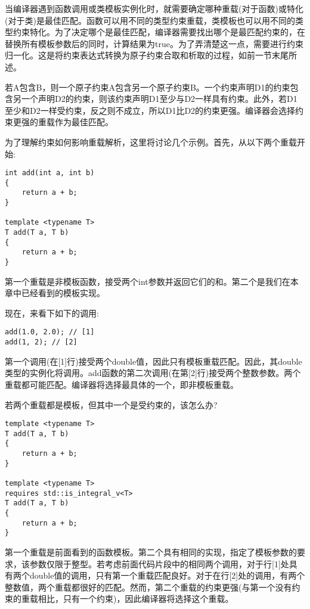 当编译器遇到函数调用或类模板实例化时，就需要确定哪种重载(对于函数)或特化(对于类)是最佳匹配。函数可以用不同的类型约束重载，类模板也可以用不同的类型约束特化。为了决定哪个是最佳匹配，编译器需要找出哪个是最匹配约束的，在替换所有模板参数后的同时，计算结果为true。为了弄清楚这一点，需要进行约束归一化。这是将约束表达式转换为原子约束合取和析取的过程，如前一节末尾所述。

若A包含B，则一个原子约束A包含另一个原子约束B。一个约束声明D1的约束包含另一个声明D2的约束，则该约束声明D1至少与D2一样具有约束。此外，若D1至少和D2一样受约束，反之则不成立，所以D1比D2的约束更强。编译器会选择约束更强的重载作为最佳匹配。

为了理解约束如何影响重载解析，这里将讨论几个示例。首先，从以下两个重载开始:

\begin{lstlisting}[style=styleCXX]
int add(int a, int b)
{
	return a + b;
}

template <typename T>
T add(T a, T b)
{
	return a + b;
}
\end{lstlisting}

第一个重载是非模板函数，接受两个int参数并返回它们的和。第二个是我们在本章中已经看到的模板实现。

现在，来看下如下的调用:

\begin{lstlisting}[style=styleCXX]
add(1.0, 2.0); // [1]
add(1, 2); // [2]
\end{lstlisting}

第一个调用(在[1]行)接受两个double值，因此只有模板重载匹配。因此，其double类型的实例化将调用。add函数的第二次调用(在第[2]行)接受两个整数参数。两个重载都可能匹配。编译器将选择最具体的一个，即非模板重载。

若两个重载都是模板，但其中一个是受约束的，该怎么办?

\begin{lstlisting}[style=styleCXX]
template <typename T>
T add(T a, T b)
{
	return a + b;
}

template <typename T>
requires std::is_integral_v<T>
T add(T a, T b)
{
	return a + b;
}
\end{lstlisting}

第一个重载是前面看到的函数模板。第二个具有相同的实现，指定了模板参数的要求，该参数仅限于整型。若考虑前面代码片段中的相同两个调用，对于行[1]处具有两个double值的调用，只有第一个重载匹配良好。对于在行[2]处的调用，有两个整数值，两个重载都很好的匹配。然而，第二个重载的约束更强(与第一个没有约束的重载相比，只有一个约束)，因此编译器将选择这个重载。

